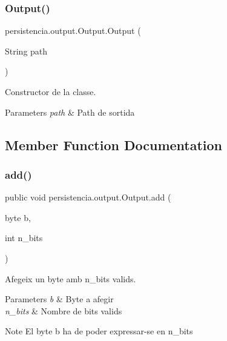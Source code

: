 \subsubsection{\texorpdfstring{Output()}{Output()}}
{\footnotesize\ttfamily persistencia.\+output.\+Output.\+Output (\begin{DoxyParamCaption}\item[{String}]{path }\end{DoxyParamCaption})\hspace{0.3cm}{\ttfamily [inline]}}



Constructor de la classe. 


\begin{DoxyParams}{Parameters}
{\em path} & Path de sortida \\
\hline
\end{DoxyParams}


\subsection{Member Function Documentation}
\mbox{\label{classpersistencia_1_1output_1_1Output_adc03a0dd7a94da21fe8432064a4eec09}} 
\subsubsection{\texorpdfstring{add()}{add()}}
{\footnotesize\ttfamily public void persistencia.\+output.\+Output.\+add (\begin{DoxyParamCaption}\item[{byte}]{b,  }\item[{int}]{n\+\_\+bits }\end{DoxyParamCaption})\hspace{0.3cm}{\ttfamily [inline]}}



Afegeix un byte amb n\+\_\+bits valids. 


\begin{DoxyParams}{Parameters}
{\em b} & Byte a afegir \\
\hline
{\em n\+\_\+bits} & Nombre de bits valids \\
\hline
\end{DoxyParams}
\begin{DoxyNote}{Note}
El byte b ha de poder expressar-\/se en n\+\_\+bits 
\end{DoxyNote}
\mbox{\label{classpersistencia_1_1output_1_1Output_ae4f870c86bed5b445125df989b313b9f}} 
